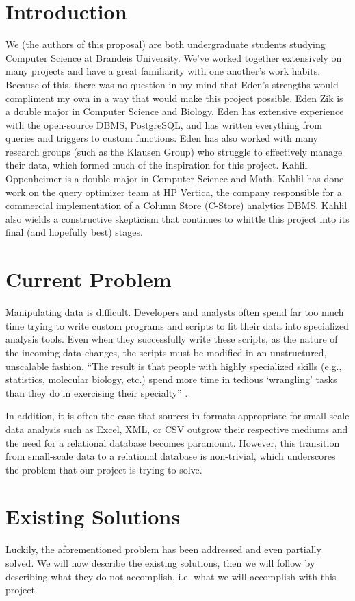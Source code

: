 \documentclass{../sty/acm_proc_article-sp}
\begin{document}
\section{Introduction}

We (the authors of this proposal) are both undergraduate students studying Computer Science at Brandeis University. We've worked together extensively on many projects and have a great familiarity with one another's work habits. Because of this, there was no question in my mind that Eden's strengths would compliment my own in a way that would make this project possible.
Eden Zik is a double major in Computer Science and Biology. Eden has extensive experience with the open-source DBMS, PostgreSQL, and has written everything from queries and triggers to custom functions. Eden has also worked with many research groups (such as the Klausen Group) who struggle to effectively manage their data, which formed much of the inspiration for this project.
Kahlil Oppenheimer is a double major in Computer Science and Math. Kahlil has done work on the query optimizer team at HP Vertica, the company responsible for a commercial implementation of a Column Store (C-Store) analytics DBMS. Kahlil also wields a constructive skepticism that continues to whittle this project into its final (and hopefully best) stages.


\section{Current Problem}
Manipulating data is difficult. Developers and analysts often spend far too much time trying to write custom programs and scripts to fit their data into specialized analysis tools. Even when they successfully write these scripts, as the nature of the incoming data changes, the scripts must be modified in an unstructured, unscalable fashion. ``The result is that people with highly specialized skills (e.g., statistics, molecular biology, etc.) spend more time in tedious `wrangling' tasks than they do in exercising their specialty'' \cite{2011-wrangler}.

In addition, it is often the case that sources in formats appropriate for small-scale data analysis such as Excel, XML, or CSV outgrow their respective mediums and the need for a relational database becomes paramount. However, this transition from small-scale data to a relational database is non-trivial, which underscores the problem that our project is trying to solve.

\section{Existing Solutions}
Luckily, the aforementioned problem has been addressed and even partially solved. We will now describe the existing solutions, then we will follow by describing what they do not accomplish, i.e. what we will accomplish with this project.
\end{document}
